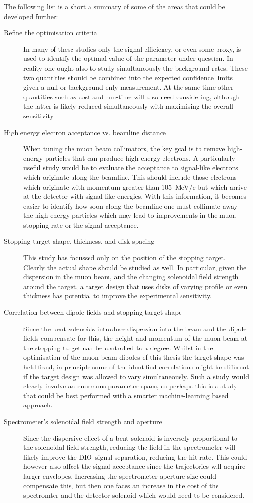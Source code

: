 The following list is a short a summary of some of the areas that could be developed further:
\begin{description}
\item[ Refine the optimisation criteria]
	In many of these studies only the signal efficiency, or even some proxy, is used to identify the optimal value of the parameter under question.
	In reality one ought also to study simultaneously the background rates.  
	These two quantities should be combined into the expected confidence limits given a null or background-only measurement.
	At the same time other quantities such as cost and run-time will also need considering, although the latter is likely reduced simultaneously with maximising the overall sensitivity.
\item[ High energy electron acceptance vs. beamline distance ]
	When tuning the muon beam collimators, the key goal is to remove high-energy particles that can produce high energy electrons. 
	A particularly useful study would be to evaluate the acceptance to signal-like electrons which originate along the beamline.
	This should include those electrons which originate with momentum greater than 105~MeV/c but which arrive at the detector with signal-like energies.
	With this information, it becomes easier to identify how soon along the beamline one must collimate away the high-energy particles which may lead to improvements in the muon stopping rate or the signal acceptance.
\item[ Stopping target shape, thickness, and disk spacing ]
	This study has focussed only on the position of the stopping target.
	Clearly the actual shape should be studied as well. In particular, given the dispersion in the muon beam, and the changing solenoidal field strength around the target, a target design that uses disks of varying profile or even thickness has potential to improve the experimental sensitivity.  
\item[ Correlation between dipole fields and stopping target shape ]
	Since the bent solenoids introduce dispersion into the beam and the dipole fields compensate for this, the height and momentum of the muon beam at the stopping target can be controlled to a degree.
	Whilst in the optimisation of the muon beam dipoles of this thesis the target shape was held fixed, in principle some of the identified correlations might be different if the target design was allowed to vary simultaneously.  
	Such a study would clearly involve an enormous parameter space, so perhaps this is a study that could be best performed with a smarter machine-learning based approach.
\item[ Spectrometer's solenoidal field strength and aperture]
	Since the dispersive effect of a bent solenoid is inversely proportional to the solenoidal field strength, reducing the field in the spectrometer will likely improve the DIO--signal separation, reducing the hit rate.
	This could however also affect the signal acceptance since the trajectories will acquire larger envelopes.
	Increasing the spectrometer aperture size could compensate this, but then one faces an increase in the cost of the spectromter and the detector solenoid which would need to be considered.
\end{description}
